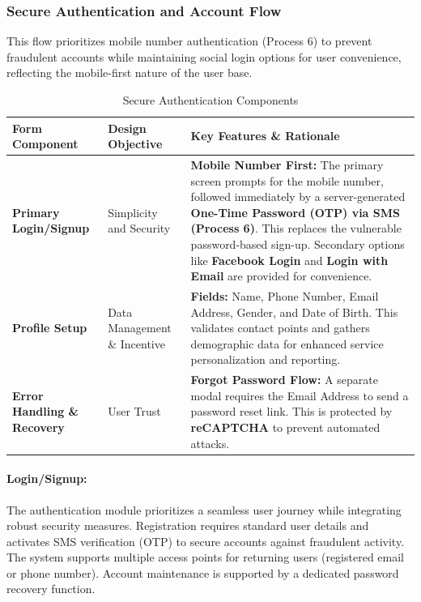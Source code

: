 \documentclass[12pt,a4paper]{article}
\begin{document}
\subsubsection{Secure Authentication and Account Flow}

This flow prioritizes mobile number authentication (Process 6) to prevent fraudulent accounts while maintaining social login options for user convenience, reflecting the mobile-first nature of the user base.

\begin{table}[H]
\centering
\small
\begin{tabular}{|L{3cm}|L{3.5cm}|L{7.5cm}|}
\hline
{}
\textbf{Form Component} & \textbf{Design Objective} & \textbf{Key Features \& Rationale} \\
\hline
\textbf{Primary Login/Signup} & Simplicity and Security & \textbf{Mobile Number First:} The primary screen prompts for the mobile number, followed immediately by a server-generated \textbf{One-Time Password (OTP) via SMS (Process 6)}. This replaces the vulnerable password-based sign-up. Secondary options like \textbf{Facebook Login} and \textbf{Login with Email} are provided for convenience. \\
\hline
\textbf{Profile Setup} & Data Management \& Incentive & \textbf{Fields:} Name, Phone Number, Email Address, Gender, and Date of Birth. This validates contact points and gathers demographic data for enhanced service personalization and reporting. \\
\hline
\textbf{Error Handling \& Recovery} & User Trust & \textbf{Forgot Password Flow:} A separate modal requires the Email Address to send a password reset link. This is protected by \textbf{reCAPTCHA} to prevent automated attacks. \\
\hline
\end{tabular}
\caption{Secure Authentication Components}
\label{tab:auth_components}
\end{table}

\paragraph{Login/Signup:}
The authentication module prioritizes a seamless user journey while integrating robust security measures. Registration requires standard user details and activates SMS verification (OTP) to secure accounts against fraudulent activity. The system supports multiple access points for returning users (registered email or phone number). Account maintenance is supported by a dedicated password recovery function.
\end{document}
